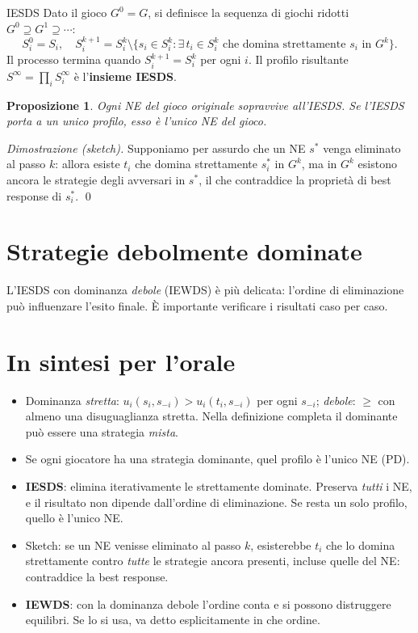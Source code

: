 \documentclass[12pt,a4paper,twoside]{book}
\theoremstyle{plain}
\newtheorem{proposition}[theorem]{Proposizione}
\theoremstyle{definition}
\begin{document}
\begin{defbox}{IESDS}
Dato il gioco $G^0=G$, si definisce la sequenza di giochi ridotti $G^0\supseteq G^1\supseteq\cdots$:
\[
  S_i^0 = S_i,\quad S_i^{k+1} = S_i^k \setminus \{s_i\in S_i^k : \exists\, t_i\in S_i^k \text{ che domina strettamente } s_i \text{ in } G^k\}.
\]
Il processo termina quando $S_i^{k+1}=S_i^k$ per ogni $i$. Il profilo risultante $S^\infty = \prod_i S_i^\infty$ è l'\textbf{insieme IESDS}.
\end{defbox}

\begin{proposition}
Ogni NE del gioco originale sopravvive all'IESDS. Se l'IESDS porta a un unico profilo, esso è l'unico NE del gioco.
\end{proposition}

\textit{Dimostrazione (sketch).} Supponiamo per assurdo che un NE $s^*$ venga eliminato al passo $k$: allora esiste $t_i$ che domina strettamente $s^*_i$ in $G^k$, ma in $G^k$ esistono ancora le strategie degli avversari in $s^*$, il che contraddice la proprietà di best response di $s^*_i$. \qed

\section{Strategie debolmente dominate}

L'IESDS con dominanza \emph{debole} (IEWDS) è più delicata: l'ordine di eliminazione può influenzare l'esito finale. È importante verificare i risultati caso per caso.

\section*{In sintesi per l'orale}
\begin{itemize}
  \item Dominanza \emph{stretta}: $u_i(s_i,s_{-i})>u_i(t_i,s_{-i})$ per ogni $s_{-i}$; \emph{debole}: $\ge$ con almeno una disuguaglianza stretta. Nella definizione completa il dominante può essere una strategia \emph{mista}.
  \item Se ogni giocatore ha una strategia dominante, quel profilo è l'unico NE (PD).
  \item \textbf{IESDS}: elimina iterativamente le strettamente dominate. Preserva \emph{tutti} i NE, e il risultato non dipende dall'ordine di eliminazione. Se resta un solo profilo, quello è l'unico NE.
  \item Sketch: se un NE venisse eliminato al passo $k$, esisterebbe $t_i$ che lo domina strettamente contro \emph{tutte} le strategie ancora presenti, incluse quelle del NE: contraddice la best response.
  \item \textbf{IEWDS}: con la dominanza debole l'ordine conta e si possono distruggere equilibri. Se lo si usa, va detto esplicitamente in che ordine.
\end{itemize}
\end{document}
